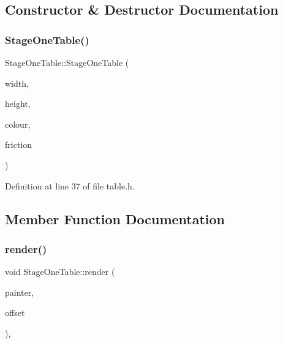 \subsection{Constructor \& Destructor Documentation}
\mbox{\label{class_stage_one_table_ae7bc7a1e4b873759a40039af326b38b9}} 
\subsubsection{\texorpdfstring{Stage\+One\+Table()}{StageOneTable()}}
{\footnotesize\ttfamily Stage\+One\+Table\+::\+Stage\+One\+Table (\begin{DoxyParamCaption}\item[{int}]{width,  }\item[{int}]{height,  }\item[{Q\+Color}]{colour,  }\item[{double}]{friction }\end{DoxyParamCaption})\hspace{0.3cm}{\ttfamily [inline]}}



Definition at line 37 of file table.\+h.



\subsection{Member Function Documentation}
\mbox{\label{class_stage_one_table_a1f6dac59ce45c370f94fb3710f744ceb}} 
\subsubsection{\texorpdfstring{render()}{render()}}
{\footnotesize\ttfamily void Stage\+One\+Table\+::render (\begin{DoxyParamCaption}\item[{Q\+Painter \&}]{painter,  }\item[{const Q\+Vector2D \&}]{offset }\end{DoxyParamCaption})\hspace{0.3cm}{\ttfamily [override]}, {\ttfamily [virtual]}}



